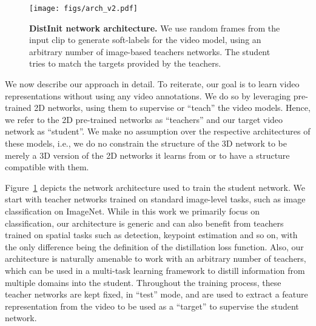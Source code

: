 \documentclass[10pt,twocolumn,letterpaper]{article}
\newcommand{\METHOD}[0]{DistInit}
\begin{document}
\begin{figure}[t]
	\centering
    \texttt{[image: figs/arch\_v2.pdf]}
    \caption{{\bf \METHOD{} network architecture.} We use random frames from the input clip to generate soft-labels for the video model, using an arbitrary number of image-based teachers networks. The student tries to match the targets provided by the  teachers.}
    \label{fig:nwarch}
\end{figure}

We now describe our approach in detail. To reiterate, our goal is to learn video representations without using any video annotations.
We do so by leveraging pre-trained 2D networks, using them to supervise or ``teach'' the video models.
Hence, we refer to the 2D pre-trained networks as ``teachers'' and our target video network as ``student''. We make no assumption over the respective architectures of these models, i.e., we do no constrain the structure of the 3D network to be merely a 3D version of the 2D networks it learns from or to have a structure compatible with them. 

Figure~\ref{fig:nwarch} depicts the network architecture used to train the student network. We start with teacher networks trained on standard image-level tasks, such as image classification on ImageNet. While in this work we primarily focus on classification, our architecture is generic and can also benefit from teachers trained on spatial tasks such as detection, keypoint estimation and so on,
with the only difference being the definition of the distillation loss function.
Also, our architecture is naturally amenable to work with an arbitrary number of teachers, which can be used in a multi-task learning framework to distill information from multiple domains into the student.  Throughout the training process, these teacher networks are kept fixed, in ``test'' mode,
and are used to extract a feature representation from the video to be used as a ``target''
to supervise the student network.
\end{document}
